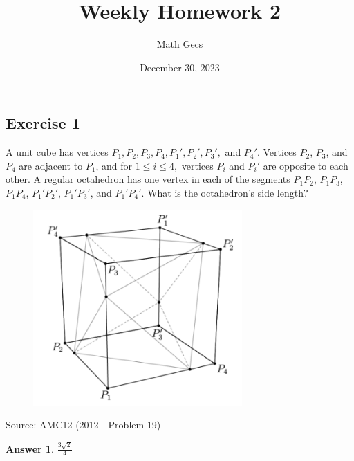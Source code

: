 \documentclass[12pt]{article}
\title{Weekly Homework 2}
\author{Math Gecs}
\date{December 30, 2023}
\newtheorem{answer}{Answer}
\begin{document}
\maketitle

\subsection*{Exercise 1}
A unit cube has vertices $P_1,P_2,P_3,P_4,P_1',P_2',P_3',$ and $P_4'$. Vertices $P_2$, $P_3$, and $P_4$ are adjacent to $P_1$, and for $1\le i\le 4,$ vertices $P_i$ and $P_i'$ are opposite to each other. A regular octahedron has one vertex in each of the segments $P_1P_2$, $P_1P_3$, $P_1P_4$, $P_1'P_2'$, $P_1'P_3'$, and $P_1'P_4'$. What is the octahedron's side length?
\\


 \begin{figure}[htp]
        \centering
        \includegraphics[width=8cm]{cube.png}
        \label{fig:assertion-cube}
     \end{figure}


Source: AMC12 (2012 - Problem 19)

\begin{answer}
$\frac{3\sqrt{2}}{4}$ \\
\end{answer}
\end{document}
